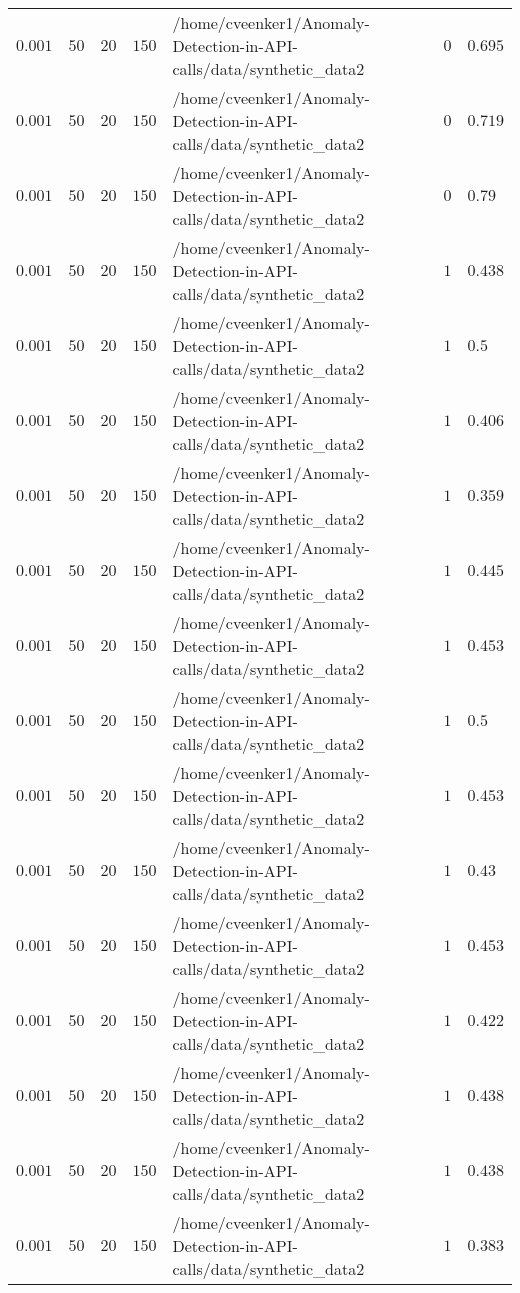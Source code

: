 \begin{table}[tbp]
\begin{tabular}{lllllll}
$0.001$ & $50$ & $20$ & $150$ & /home/cveenker1/Anomaly-Detection-in-API-calls/data/synthetic\_data2 & $0$ & $0.695$ \\
$0.001$ & $50$ & $20$ & $150$ & /home/cveenker1/Anomaly-Detection-in-API-calls/data/synthetic\_data2 & $0$ & $0.719$ \\
$0.001$ & $50$ & $20$ & $150$ & /home/cveenker1/Anomaly-Detection-in-API-calls/data/synthetic\_data2 & $0$ & $0.79$ \\
$0.001$ & $50$ & $20$ & $150$ & /home/cveenker1/Anomaly-Detection-in-API-calls/data/synthetic\_data2 & $1$ & $0.438$ \\
$0.001$ & $50$ & $20$ & $150$ & /home/cveenker1/Anomaly-Detection-in-API-calls/data/synthetic\_data2 & $1$ & $0.5$ \\
$0.001$ & $50$ & $20$ & $150$ & /home/cveenker1/Anomaly-Detection-in-API-calls/data/synthetic\_data2 & $1$ & $0.406$ \\
$0.001$ & $50$ & $20$ & $150$ & /home/cveenker1/Anomaly-Detection-in-API-calls/data/synthetic\_data2 & $1$ & $0.359$ \\
$0.001$ & $50$ & $20$ & $150$ & /home/cveenker1/Anomaly-Detection-in-API-calls/data/synthetic\_data2 & $1$ & $0.445$ \\
$0.001$ & $50$ & $20$ & $150$ & /home/cveenker1/Anomaly-Detection-in-API-calls/data/synthetic\_data2 & $1$ & $0.453$ \\
$0.001$ & $50$ & $20$ & $150$ & /home/cveenker1/Anomaly-Detection-in-API-calls/data/synthetic\_data2 & $1$ & $0.5$ \\
$0.001$ & $50$ & $20$ & $150$ & /home/cveenker1/Anomaly-Detection-in-API-calls/data/synthetic\_data2 & $1$ & $0.453$ \\
$0.001$ & $50$ & $20$ & $150$ & /home/cveenker1/Anomaly-Detection-in-API-calls/data/synthetic\_data2 & $1$ & $0.43$ \\
$0.001$ & $50$ & $20$ & $150$ & /home/cveenker1/Anomaly-Detection-in-API-calls/data/synthetic\_data2 & $1$ & $0.453$ \\
$0.001$ & $50$ & $20$ & $150$ & /home/cveenker1/Anomaly-Detection-in-API-calls/data/synthetic\_data2 & $1$ & $0.422$ \\
$0.001$ & $50$ & $20$ & $150$ & /home/cveenker1/Anomaly-Detection-in-API-calls/data/synthetic\_data2 & $1$ & $0.438$ \\
$0.001$ & $50$ & $20$ & $150$ & /home/cveenker1/Anomaly-Detection-in-API-calls/data/synthetic\_data2 & $1$ & $0.438$ \\
$0.001$ & $50$ & $20$ & $150$ & /home/cveenker1/Anomaly-Detection-in-API-calls/data/synthetic\_data2 & $1$ & $0.383$ \\

\end{tabular}
\end{table}
